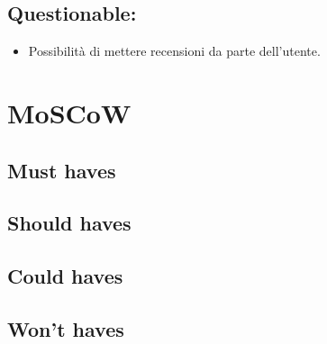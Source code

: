 \documentclass{article}
\begin{document}
\subsection{Questionable:}
\begin{itemize}
    \item Possibilità di mettere recensioni da parte dell'utente.
\end{itemize}

\section{MoSCoW}

\subsection{Must haves}
\subsection{Should haves}
\subsection{Could haves}
\subsection{Won't haves}
\end{document}
